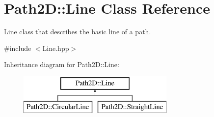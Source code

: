 \hypertarget{class_path2_d_1_1_line}{}\section{Path2D\+:\+:Line Class Reference}
\label{class_path2_d_1_1_line}


\mbox{\hyperlink{class_path2_d_1_1_line}{Line}} class that describes the basic line of a path.  




{\ttfamily \#include $<$Line.\+hpp$>$}

Inheritance diagram for Path2D\+:\+:Line\+:\begin{figure}[H]
\begin{center}
\leavevmode
\includegraphics[height=2.000000cm]{class_path2_d_1_1_line}
\end{center}
\end{figure}
